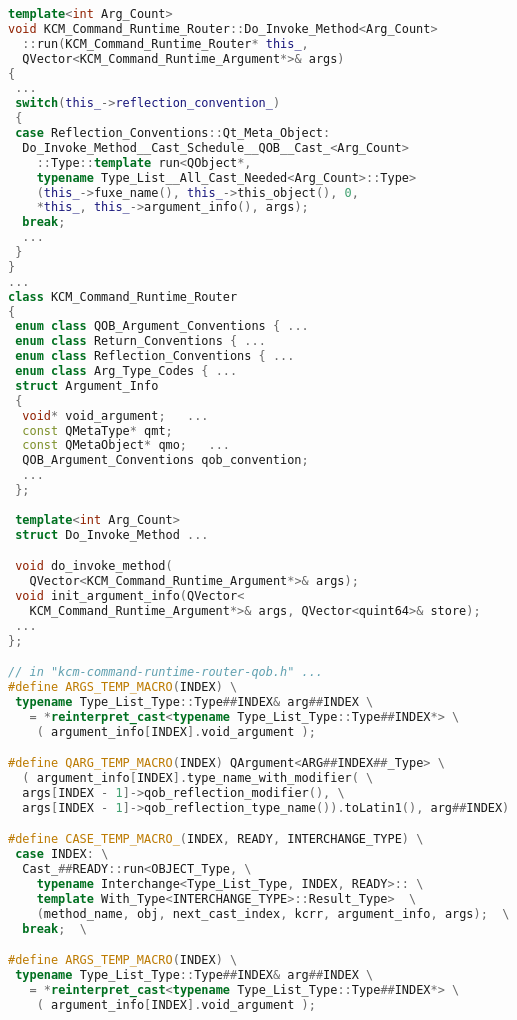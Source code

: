 \vspace{-.5em}
\begin{lstlisting}[caption={Sample Code Graph Evaluator}, 
  language = C++, numbers = none, label={lst:rzsem},
    basicstyle = \ttfamily\bfseries\footnotesize, linewidth = \linewidth]
template<int Arg_Count> 
void KCM_Command_Runtime_Router::Do_Invoke_Method<Arg_Count>
  ::run(KCM_Command_Runtime_Router* this_, 
  QVector<KCM_Command_Runtime_Argument*>& args)
{
 ...
 switch(this_->reflection_convention_)
 {
 case Reflection_Conventions::Qt_Meta_Object:
  Do_Invoke_Method__Cast_Schedule__QOB__Cast_<Arg_Count>
    ::Type::template run<QObject*, 
    typename Type_List__All_Cast_Needed<Arg_Count>::Type>
    (this_->fuxe_name(), this_->this_object(), 0, 
    *this_, this_->argument_info(), args);
  break;
  ...
 }
}
...
class KCM_Command_Runtime_Router
{
 enum class QOB_Argument_Conventions { ...
 enum class Return_Conventions { ...
 enum class Reflection_Conventions { ...
 enum class Arg_Type_Codes { ...
 struct Argument_Info 
 {
  void* void_argument;   ...
  const QMetaType* qmt;
  const QMetaObject* qmo;   ...
  QOB_Argument_Conventions qob_convention; 
  ...
 };
 
 template<int Arg_Count>
 struct Do_Invoke_Method ...

 void do_invoke_method(
   QVector<KCM_Command_Runtime_Argument*>& args);
 void init_argument_info(QVector<
   KCM_Command_Runtime_Argument*>& args, QVector<quint64>& store);
 ...
};

// in "kcm-command-runtime-router-qob.h" ...
#define ARGS_TEMP_MACRO(INDEX) \
 typename Type_List_Type::Type##INDEX& arg##INDEX \
   = *reinterpret_cast<typename Type_List_Type::Type##INDEX*> \
    ( argument_info[INDEX].void_argument );

#define QARG_TEMP_MACRO(INDEX) QArgument<ARG##INDEX##_Type> \
  ( argument_info[INDEX].type_name_with_modifier( \
  args[INDEX - 1]->qob_reflection_modifier(), \
  args[INDEX - 1]->qob_reflection_type_name()).toLatin1(), arg##INDEX) \

#define CASE_TEMP_MACRO_(INDEX, READY, INTERCHANGE_TYPE) \
 case INDEX: \
  Cast_##READY::run<OBJECT_Type, \
    typename Interchange<Type_List_Type, INDEX, READY>:: \
    template With_Type<INTERCHANGE_TYPE>::Result_Type>  \
    (method_name, obj, next_cast_index, kcrr, argument_info, args);  \
  break;  \

#define ARGS_TEMP_MACRO(INDEX) \
 typename Type_List_Type::Type##INDEX& arg##INDEX \
   = *reinterpret_cast<typename Type_List_Type::Type##INDEX*> \
    ( argument_info[INDEX].void_argument );


\end{lstlisting}
